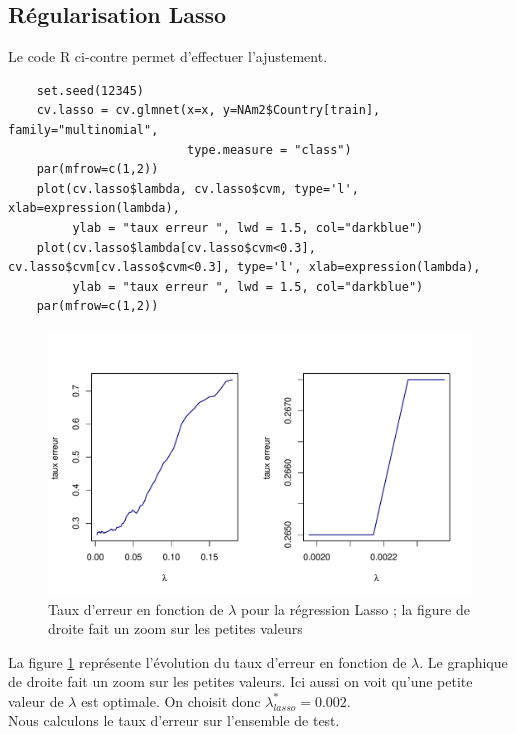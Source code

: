 \documentclass[12pt,a4paper]{article}
\begin{document}
\subsection{Régularisation Lasso}
Le code R ci-contre permet d'effectuer l'ajustement.
\begin{lstlisting}
	set.seed(12345)
	cv.lasso = cv.glmnet(x=x, y=NAm2$Country[train], family="multinomial",
	                     type.measure = "class")
	par(mfrow=c(1,2))
	plot(cv.lasso$lambda, cv.lasso$cvm, type='l', xlab=expression(lambda),
	     ylab = "taux erreur ", lwd = 1.5, col="darkblue")
	plot(cv.lasso$lambda[cv.lasso$cvm<0.3], cv.lasso$cvm[cv.lasso$cvm<0.3], type='l', xlab=expression(lambda),
	     ylab = "taux erreur ", lwd = 1.5, col="darkblue")
	par(mfrow=c(1,2))
\end{lstlisting}
\begin{figure}[h!]
	\begin{center}
		\includegraphics[scale=0.7]{figures/l_opt.pdf}
		\caption{Taux d'erreur en fonction de $\lambda$ pour la régression Lasso ; la figure de  droite fait un zoom sur les petites valeurs}
		\label{fig:l_opt}
	\end{center}
\end{figure}
La figure \ref{fig:l_opt} représente l'évolution du taux d'erreur en fonction
de $\lambda$. Le graphique de droite fait un zoom sur les petites valeurs. Ici
aussi on voit qu'une petite valeur de $\lambda$ est optimale. On choisit donc
$\lambda_{lasso}^* = 0.002$.\\
Nous calculons le taux d'erreur sur l'ensemble de test.
\end{document}
